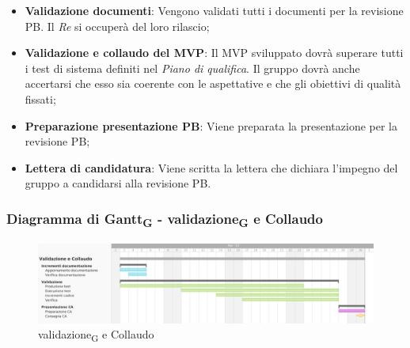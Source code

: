\:
\begin{itemize}
	\item \textbf{Validazione documenti}: Vengono validati tutti i documenti per la revisione PB. Il \textit{Re} si occuperà del loro rilascio;
	\item \textbf{Validazione e collaudo del MVP}: Il MVP sviluppato dovrà superare tutti i test di sistema definiti nel \textit{Piano di qualifica}. Il gruppo dovrà anche accertarsi che esso sia coerente con le aspettative e che gli obiettivi di qualità fissati;
	\item \textbf{Preparazione presentazione PB}: Viene preparata la presentazione per la revisione PB;
	\item \textbf{Lettera di candidatura}: Viene scritta la lettera che dichiara l'impegno del gruppo a candidarsi alla revisione PB.
\end{itemize}

\subsubsection{Diagramma di Gantt\textsubscript{G} - validazione\textsubscript{G} e Collaudo}

\begin{figure}[H]
\centering
\includegraphics[width=\textwidth]{img/4_collaudo.png}
\caption{validazione\textsubscript{G} e Collaudo}
\end{figure}

